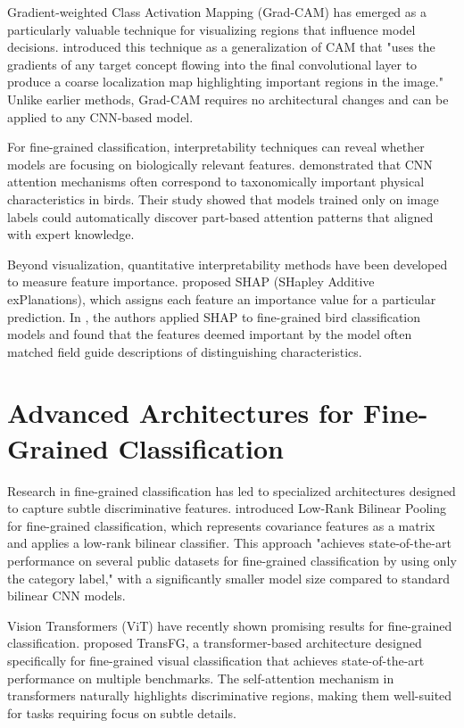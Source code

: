 \documentclass[a4paper,12pt]{article}
\begin{document}
Gradient-weighted Class Activation Mapping (Grad-CAM) has emerged as a particularly valuable technique for visualizing regions that influence model decisions. \citep{selvaraju2017grad} introduced this technique as a generalization of CAM that "uses the gradients of any target concept flowing into the final convolutional layer to produce a coarse localization map highlighting important regions in the image." Unlike earlier methods, Grad-CAM requires no architectural changes and can be applied to any CNN-based model.

For fine-grained classification, interpretability techniques can reveal whether models are focusing on biologically relevant features. \citep{zhang2018interpretable} demonstrated that CNN attention mechanisms often correspond to taxonomically important physical characteristics in birds. Their study showed that models trained only on image labels could automatically discover part-based attention patterns that aligned with expert knowledge.

Beyond visualization, quantitative interpretability methods have been developed to measure feature importance. \citep{lundberg2017unified} proposed SHAP (SHapley Additive exPlanations), which assigns each feature an importance value for a particular prediction. In \citep{chen2019looks}, the authors applied SHAP to fine-grained bird classification models and found that the features deemed important by the model often matched field guide descriptions of distinguishing characteristics.

\section*{Advanced Architectures for Fine-Grained Classification}
Research in fine-grained classification has led to specialized architectures designed to capture subtle discriminative features. \citep{kong2017low} introduced Low-Rank Bilinear Pooling for fine-grained classification, which represents covariance features as a matrix and applies a low-rank bilinear classifier. This approach "achieves state-of-the-art performance on several public datasets for fine-grained classification by using only the category label," with a significantly smaller model size compared to standard bilinear CNN models.

Vision Transformers (ViT) have recently shown promising results for fine-grained classification. \citep{he2022transfg} proposed TransFG, a transformer-based architecture designed specifically for fine-grained visual classification that achieves state-of-the-art performance on multiple benchmarks. The self-attention mechanism in transformers naturally highlights discriminative regions, making them well-suited for tasks requiring focus on subtle details.
\end{document}
